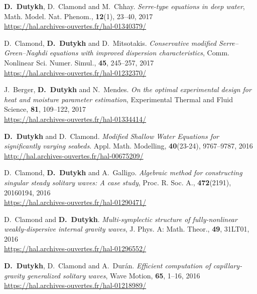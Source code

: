 \begin{etaremune}
  \item \textbf{D.~Dutykh}, D.~Clamond and M.~Chhay. \textit{Serre-type equations in deep water}, Math. Model. Nat. Phenom., \textbf{12}(1), 23--40, 2017 \\ %
  \url{https://hal.archives-ouvertes.fr/hal-01340379/}

  \item D.~Clamond, \textbf{D.~Dutykh} and D.~Mitsotakis. \textit{Conservative modified Serre--Green--Naghdi equations with improved dispersion characteristics}, Comm. Nonlinear Sci. Numer. Simul., \textbf{45}, 245--257, 2017 \\ %
  \url{https://hal.archives-ouvertes.fr/hal-01232370/}

  \item J.~Berger, \textbf{D.~Dutykh} and N.~Mendes. \textit{On the optimal experimental design for heat and moisture parameter estimation}, Experimental Thermal and Fluid Science, \textbf{81}, 109--122, 2017 \\ %
  \url{https://hal.archives-ouvertes.fr/hal-01334414/}
  

  \item \textbf{D.~Dutykh} and D.~Clamond. \textit{Modified Shallow Water Equations for significantly varying seabeds}. Appl. Math. Modelling, \textbf{40}(23-24), 9767--9787, 2016 \\ %
  \url{http://hal.archives-ouvertes.fr/hal-00675209/}

  \item D.~Clamond, \textbf{D.~Dutykh} and A.~Galligo. \textit{Algebraic method for constructing singular steady solitary waves: A case study}, Proc. R. Soc. A., \textbf{472}(2191), 20160194, 2016 \\ %
  \url{https://hal.archives-ouvertes.fr/hal-01290471/}
  
  \item D.~Clamond and \textbf{D.~Dutykh}. \textit{Multi-symplectic structure of fully-nonlinear weakly-dispersive internal gravity waves}, J. Phys. A: Math. Theor., \textbf{49}, 31LT01, 2016 \\ %
  \url{https://hal.archives-ouvertes.fr/hal-01296552/}

  \item \textbf{D.~Dutykh}, D.~Clamond and A.~Dur\'an. \textit{Efficient computation of capillary-gravity generalized solitary waves}, Wave Motion, \textbf{65}, 1--16, 2016 \\ %
  \url{https://hal.archives-ouvertes.fr/hal-01218989/}
  

\end{etaremune}
